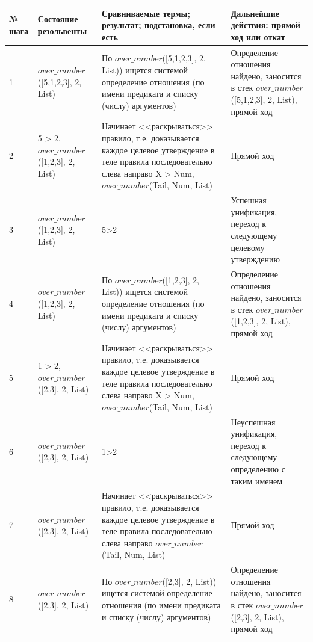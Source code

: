 \documentclass[a4paper,14pt]{extreport} %
\begin{document}
\begin{longtable}{|p{0.5cm}|p{5cm}|p{6cm}|p{5.5cm}|}
	\hline
 	№ шага & Состояние резольвенты & Сравниваемые термы; результат; подстановка, если есть  & Дальнейшие действия: прямой ход или откат \\ \hline
	1 & $over\_number$([5,1,2,3], 2, List) & По $over\_number$([5,1,2,3], 2, List)) ищется системой определение отношения (по имени предиката и списку (числу) аргументов) & Определение отношения найдено, заносится в стек $over\_number$([5,1,2,3], 2, List), прямой ход \\ \hline
	
	2 &5 > 2, $over\_number$([1,2,3], 2, List) & Начинает <<раскрываться>> правило, т.е. доказывается каждое целевое утверждение в теле правила последовательно слева направо
	X > Num, $over\_number$(Tail, Num, List) & Прямой ход\\ \hline
	
	3 & $over\_number$([1,2,3], 2, List) & 5>2 & Успешная унификация, переход к следующему целевому утверждению \\ \hline
	
	4 & $over\_number$([1,2,3], 2, List) & По $over\_number$([1,2,3], 2, List)) ищется системой определение отношения (по имени предиката и списку (числу) аргументов) & Определение отношения найдено, заносится в стек $over\_number$([1,2,3], 2, List), прямой ход \\ \hline
	
	5 &1 > 2, $over\_number$([2,3], 2, List) & Начинает <<раскрываться>> правило, т.е. доказывается каждое целевое утверждение в теле правила последовательно слева направо
	X > Num, $over\_number$(Tail, Num, List) & Прямой ход\\ \hline
	
	6 & $over\_number$([2,3], 2, List) & 1>2 & Неуспешная унификация, переход к следующему определению с таким именем \\ \hline
	
	7 & $over\_number$([2,3], 2, List) & Начинает <<раскрываться>> правило, т.е. доказывается каждое целевое утверждение в теле правила последовательно слева направо
	$over\_number$(Tail, Num, List) & Прямой ход\\ \hline
	
	8 & $over\_number$([2,3], 2, List) & По $over\_number$([2,3], 2, List)) ищется системой определение отношения (по имени предиката и списку (числу) аргументов) & Определение отношения найдено, заносится в стек $over\_number$([2,3], 2, List), прямой ход \\ \hline
	

\end{longtable}
\end{document}
